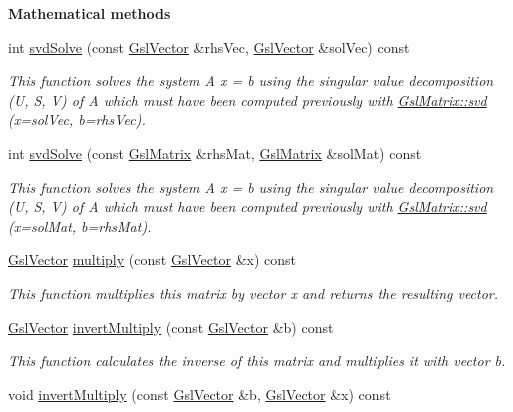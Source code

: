 \begin{Indent}{\bf Mathematical methods}
\begin{DoxyCompactItemize}
int \hyperlink{class_q_u_e_s_o_1_1_gsl_matrix_ad4e17207209e41e4c91eefd31af4733c}{svd\-Solve} (const \hyperlink{class_q_u_e_s_o_1_1_gsl_vector}{Gsl\-Vector} \&rhs\-Vec, \hyperlink{class_q_u_e_s_o_1_1_gsl_vector}{Gsl\-Vector} \&sol\-Vec) const 
\begin{DoxyCompactList}\small\item\em This function solves the system A x = b using the singular value decomposition (U, S, V) of A which must have been computed previously with \hyperlink{class_q_u_e_s_o_1_1_gsl_matrix_a969f83e4d889e7d627055dae52968573}{Gsl\-Matrix\-::svd} (x=sol\-Vec, b=rhs\-Vec). \end{DoxyCompactList}\item 
int \hyperlink{class_q_u_e_s_o_1_1_gsl_matrix_a8aac01c8c24ce3c0701d3b3504b37107}{svd\-Solve} (const \hyperlink{class_q_u_e_s_o_1_1_gsl_matrix}{Gsl\-Matrix} \&rhs\-Mat, \hyperlink{class_q_u_e_s_o_1_1_gsl_matrix}{Gsl\-Matrix} \&sol\-Mat) const 
\begin{DoxyCompactList}\small\item\em This function solves the system A x = b using the singular value decomposition (U, S, V) of A which must have been computed previously with \hyperlink{class_q_u_e_s_o_1_1_gsl_matrix_a969f83e4d889e7d627055dae52968573}{Gsl\-Matrix\-::svd} (x=sol\-Mat, b=rhs\-Mat). \end{DoxyCompactList}\item 
\hyperlink{class_q_u_e_s_o_1_1_gsl_vector}{Gsl\-Vector} \hyperlink{class_q_u_e_s_o_1_1_gsl_matrix_a842b097716372288ef1dc0616bde9bec}{multiply} (const \hyperlink{class_q_u_e_s_o_1_1_gsl_vector}{Gsl\-Vector} \&x) const 
\begin{DoxyCompactList}\small\item\em This function multiplies {\ttfamily this} matrix by vector {\ttfamily x} and returns the resulting vector. \end{DoxyCompactList}\item 
\hyperlink{class_q_u_e_s_o_1_1_gsl_vector}{Gsl\-Vector} \hyperlink{class_q_u_e_s_o_1_1_gsl_matrix_a2eea3056f561ffeaee754b71cfcfa27e}{invert\-Multiply} (const \hyperlink{class_q_u_e_s_o_1_1_gsl_vector}{Gsl\-Vector} \&b) const 
\begin{DoxyCompactList}\small\item\em This function calculates the inverse of {\ttfamily this} matrix and multiplies it with vector {\ttfamily b}. \end{DoxyCompactList}\item 
void \hyperlink{class_q_u_e_s_o_1_1_gsl_matrix_ac70cff611af683b8a5079c6bfe0474ef}{invert\-Multiply} (const \hyperlink{class_q_u_e_s_o_1_1_gsl_vector}{Gsl\-Vector} \&b, \hyperlink{class_q_u_e_s_o_1_1_gsl_vector}{Gsl\-Vector} \&x) const 

\end{DoxyCompactItemize}
\end{Indent}
